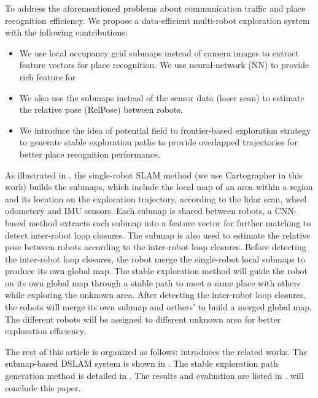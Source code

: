 To address the aforementioned problems about communication traffic and place recognition efficiency. We propose a data-efficient multi-robot  exploration system with the following contributions:

\begin{itemize}
    \item We use local occupancy grid submaps instead of camera images to extract feature vectors for place recognition. We use neural-network (NN) to provide rich feature for 
    \item We also use the submaps instead of the sensor data (laser scan) to estimate the relative pose (RelPose) between robots.
    \item We introduce the idea of potential field to frontier-based exploration strategy to generate stable exploration paths to provide overlapped trajectories for better place recognition performance.
\end{itemize}



As illustrated in . the single-robot SLAM method (we use Cartographer \cite{hess2016real} in this work) builds the submaps, which include the local map of an area within a region and its location on the exploration trajectory, according to the lidar scan, wheel odometery and IMU sensors.
Each submap is shared between robots, a CNN-based method extracts each submap into a feature vector for further matching to detect inter-robot loop closures.
The submap is also used to estimate the relative pose between robots according to the inter-robot loop closures.
Before detecting the inter-robot loop closures, the robot merge the single-robot local submaps to produce its own global map. 
The stable exploration method will guide the robot on its own global map through a stable path to meet a same place with others while exploring the unknown area.
After detecting the inter-robot loop closures, the robots will merge its own submap and orthers' to build a merged global map. The different robots will be assigned to different unknown area for better exploration efficiency.


The rest of this article is organized as follows:  introduces the related works. The submap-based DSLAM system is shown in . The stable exploration path generation method is detailed in . The results and evaluation are listed in .  will conclude this paper.